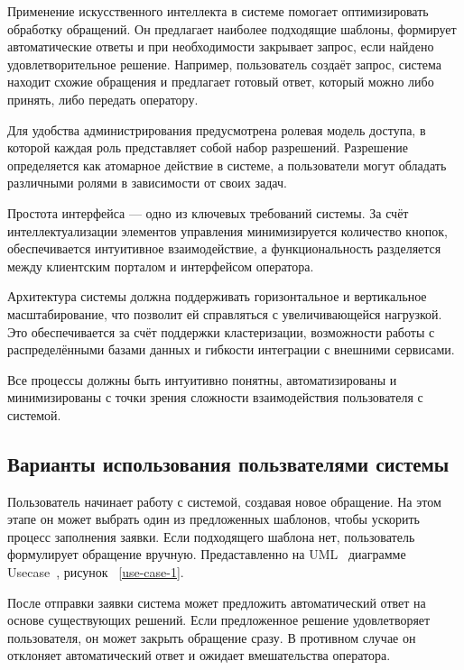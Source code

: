 Применение искусственного интеллекта в системе помогает оптимизировать обработку обращений. Он предлагает наиболее подходящие шаблоны, формирует автоматические ответы и при необходимости закрывает запрос, если найдено удовлетворительное решение. Например, пользователь создаёт запрос, система находит схожие обращения и предлагает готовый ответ, который можно либо принять, либо передать оператору.

Для удобства администрирования предусмотрена ролевая модель доступа, в которой каждая роль представляет собой набор разрешений. Разрешение определяется как атомарное действие в системе, а пользователи могут обладать различными ролями в зависимости от своих задач.

Простота интерфейса — одно из ключевых требований системы. За счёт интеллектуализации элементов управления минимизируется количество кнопок, обеспечивается интуитивное взаимодействие, а функциональность разделяется между клиентским порталом и интерфейсом оператора.

Архитектура системы должна поддерживать горизонтальное и вертикальное масштабирование, что позволит ей справляться с увеличивающейся нагрузкой. Это обеспечивается за счёт поддержки кластеризации, возможности работы с распределёнными базами данных и гибкости интеграции с внешними сервисами.

Все процессы должны быть интуитивно понятны, автоматизированы и минимизированы с точки зрения сложности взаимодействия пользователя с системой.

\subsection{Варианты использования пользвателями системы}

Пользователь начинает работу с системой, создавая новое обращение. На этом этапе он может выбрать один из предложенных шаблонов, чтобы ускорить процесс заполнения заявки. Если подходящего шаблона нет, пользователь формулирует обращение вручную. Предаставленно на UML~\cite{Uml} диаграмме Usecase~\cite{Usecase}, рисунок ~\ref{use-case-1}.


После отправки заявки система может предложить автоматический ответ на основе существующих решений. Если предложенное решение удовлетворяет пользователя, он может закрыть обращение сразу. В противном случае он отклоняет автоматический ответ и ожидает вмешательства оператора.


